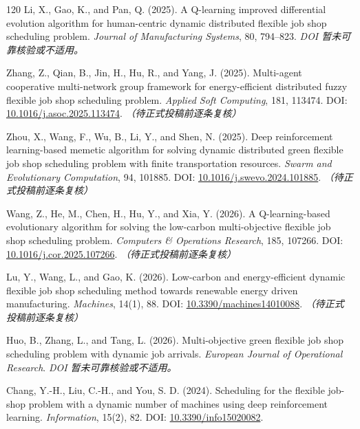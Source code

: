 \documentclass[UTF8,a4paper,11pt]{ctexart}
\begin{document}
\begin{thebibliography}{120}
Li, X., Gao, K., and Pan, Q. (2025). A Q-learning improved differential evolution algorithm for human-centric dynamic distributed flexible job shop scheduling problem. \emph{Journal of Manufacturing Systems}, 80, 794--823.
\newblock \textit{DOI 暂未可靠核验或不适用。}

Zhang, Z., Qian, B., Jin, H., Hu, R., and Yang, J. (2025). Multi-agent cooperative multi-network group framework for energy-efficient distributed fuzzy flexible job shop scheduling problem. \emph{Applied Soft Computing}, 181, 113474.
\newblock DOI: \href{https://doi.org/10.1016/j.asoc.2025.113474}{10.1016/j.asoc.2025.113474}. \textit{（待正式投稿前逐条复核）}

Zhou, X., Wang, F., Wu, B., Li, Y., and Shen, N. (2025). Deep reinforcement learning-based memetic algorithm for solving dynamic distributed green flexible job shop scheduling problem with finite transportation resources. \emph{Swarm and Evolutionary Computation}, 94, 101885.
\newblock DOI: \href{https://doi.org/10.1016/j.swevo.2024.101885}{10.1016/j.swevo.2024.101885}. \textit{（待正式投稿前逐条复核）}

Wang, Z., He, M., Chen, H., Hu, Y., and Xia, Y. (2026). A Q-learning-based evolutionary algorithm for solving the low-carbon multi-objective flexible job shop scheduling problem. \emph{Computers \& Operations Research}, 185, 107266.
\newblock DOI: \href{https://doi.org/10.1016/j.cor.2025.107266}{10.1016/j.cor.2025.107266}. \textit{（待正式投稿前逐条复核）}

Lu, Y., Wang, L., and Gao, K. (2026). Low-carbon and energy-efficient dynamic flexible job shop scheduling method towards renewable energy driven manufacturing. \emph{Machines}, 14(1), 88.
\newblock DOI: \href{https://doi.org/10.3390/machines14010088}{10.3390/machines14010088}. \textit{（待正式投稿前逐条复核）}

Huo, B., Zhang, L., and Tang, L. (2026). Multi-objective green flexible job shop scheduling problem with dynamic job arrivals. \emph{European Journal of Operational Research}.
\newblock \textit{DOI 暂未可靠核验或不适用。}

Chang, Y.-H., Liu, C.-H., and You, S. D. (2024). Scheduling for the flexible job-shop problem with a dynamic number of machines using deep reinforcement learning. \emph{Information}, 15(2), 82.
\newblock DOI: \href{https://doi.org/10.3390/info15020082}{10.3390/info15020082}.

\end{thebibliography}
\end{document}
